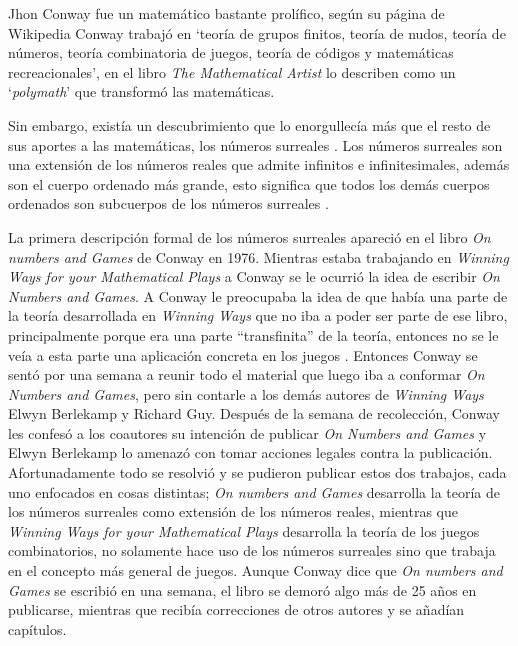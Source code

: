 Jhon Conway fue un matem\'atico bastante prol\'ifico, seg\'un su p\'agina de Wikipedia \cite{wiki:John_Horton_Conway} Conway trabaj\'o en `teor\'ia de grupos finitos, teor\'ia de nudos, teor\'ia de n\'umeros, teor\'ia combinatoria de juegos, teor\'ia de c\'odigos y matem\'aticas recreacionales', en el libro \textit{The Mathematical Artist} \cite{MathematicalArtist2022} lo describen como un `\textit{polymath}' que transform\'o las matem\'aticas.

Sin embargo, exist\'ia un descubrimiento que lo enorgullec\'ia m\'as que el resto de sus aportes a las matem\'aticas, los n\'umeros surreales \cite{YTNumberphileConway}. Los n\'umeros surreales son una extensi\'on de los n\'umeros reales que admite infinitos e infinitesimales, adem\'as son el cuerpo ordenado m\'as grande, esto significa que todos los dem\'as cuerpos ordenados son subcuerpos de los n\'umeros surreales \cite{Bajnok2013}.

La primera descripci\'on formal de los n\'umeros surreales apareci\'o en el libro \textit{On numbers and Games} de Conway en 1976. Mientras estaba trabajando en \textit{Winning Ways for your Mathematical Plays} a Conway se le ocurri\'o la idea de escribir \textit{On Numbers and Games}. A Conway le preocupaba la idea de que hab\'ia una parte de la teor\'ia desarrollada en \textit{Winning Ways} que no iba a poder ser parte de ese libro, principalmente porque era una parte ``transfinita'' de la teor\'ia, entonces no se le ve\'ia a esta parte una aplicaci\'on concreta en los juegos \cite{Conway2000}. Entonces Conway se sent\'o por una semana a reunir todo el material que luego iba a conformar \textit{On Numbers and Games}, pero sin contarle a los dem\'as autores de \textit{Winning Ways} Elwyn Berlekamp y Richard Guy. Despu\'es de la semana de recolecci\'on, Conway les confes\'o a los coautores su intenci\'on de publicar \textit{On Numbers and Games} y Elwyn Berlekamp lo amenaz\'o con tomar acciones legales contra la publicaci\'on. Afortunadamente todo se resolvi\'o y se pudieron publicar estos dos trabajos, cada uno enfocados en cosas distintas; \textit{On numbers and Games} desarrolla la teor\'ia de los n\'umeros surreales como extensi\'on de los n\'umeros reales, mientras que \textit{Winning Ways for your Mathematical Plays} desarrolla la teor\'ia de los juegos combinatorios, no solamente hace uso de los n\'umeros surreales sino que trabaja en el concepto m\'as general de juegos. Aunque Conway dice que \textit{On numbers and Games} se escribi\'o en una semana, el libro se demor\'o algo m\'as de 25 a\~nos en publicarse, mientras que recib\'ia correcciones de otros autores y se a\~nad\'ian cap\'itulos.

